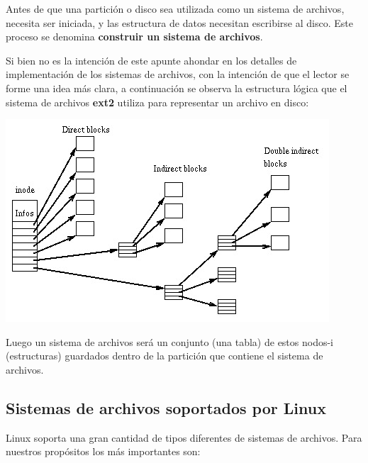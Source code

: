 \documentclass[12pt]{article}
\begin{document}
Antes de que una partición o disco sea utilizada como un sistema de 
archivos, necesita ser iniciada, y las estructura de datos necesitan 
escribirse al disco. Este proceso se denomina \textbf{construir un sistema
de archivos}.

Si bien no es la intención de este apunte ahondar en los detalles de 
implementación de los sistemas de archivos, con la intención de que el 
lector se forme una idea más clara, a continuación se observa la estructura
lógica que el sistema de archivos \textbf{ext2} utiliza para representar
un archivo en disco: 

\begin{center}
 \includegraphics{Ext2-inode.jpg}
\end{center}

Luego un sistema de archivos será un conjunto (una tabla) de estos
nodos-i (estructuras) guardados dentro de la partición que contiene el 
sistema de archivos. 



\subsection*{Sistemas de archivos soportados por Linux}

Linux soporta una gran cantidad de tipos diferentes de sistemas de archivos. Para nuestros propósitos los más importantes son:
\end{document}
